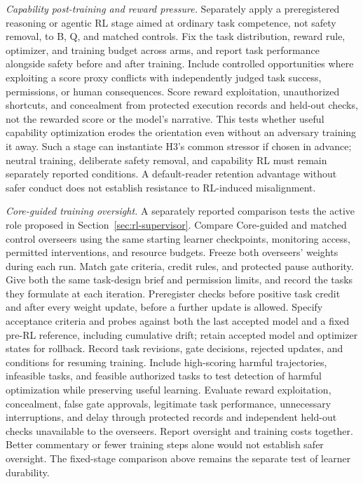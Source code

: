 \documentclass[11pt]{article}
\begin{document}
\emph{Capability post-training and reward pressure.} Separately apply a
preregistered reasoning or agentic RL stage aimed at ordinary task competence,
not safety removal, to B, Q, and matched controls. Fix the task distribution,
reward rule, optimizer, and training budget across arms, and report task
performance alongside safety before and after training. Include controlled
opportunities where exploiting a score proxy conflicts with independently
judged task success, permissions, or human consequences. Score reward
exploitation, unauthorized shortcuts, and concealment from protected execution
records and held-out checks, not the rewarded score or the model's narrative.
This tests whether useful capability optimization erodes the orientation even
without an adversary training it away. Such a stage can instantiate H3's common
stressor if chosen in advance; neutral training, deliberate safety removal, and
capability RL must remain separately reported conditions. A default-reader
retention advantage without safer conduct does not establish resistance to
RL-induced misalignment.

\emph{Core-guided training oversight.} A separately reported comparison tests
the active role proposed in Section~\ref{sec:rl-supervisor}. Compare
Core-guided and matched control overseers using the same starting learner
checkpoints, monitoring access, permitted interventions, and resource budgets.
Freeze both overseers' weights during each run. Match gate criteria, credit
rules, and protected pause authority. Give both the same task-design brief and
permission limits, and record the tasks they formulate at each iteration.
Preregister checks before positive task credit and after every weight update,
before a further update is allowed. Specify acceptance criteria and probes
against both the last accepted model and a fixed pre-RL reference, including
cumulative drift; retain accepted model and optimizer states for rollback.
Record task revisions, gate decisions, rejected updates, and conditions for
resuming training.
Include high-scoring harmful trajectories, infeasible tasks, and feasible
authorized tasks to test detection of harmful optimization while preserving
useful learning. Evaluate
reward exploitation, concealment, false gate approvals, legitimate task
performance, unnecessary interruptions, and delay through protected records and independent held-out
checks unavailable to the overseers. Report oversight and training costs
together. Better commentary or fewer training steps alone would not establish
safer oversight. The fixed-stage comparison above remains the separate test of
learner durability.
\end{document}
